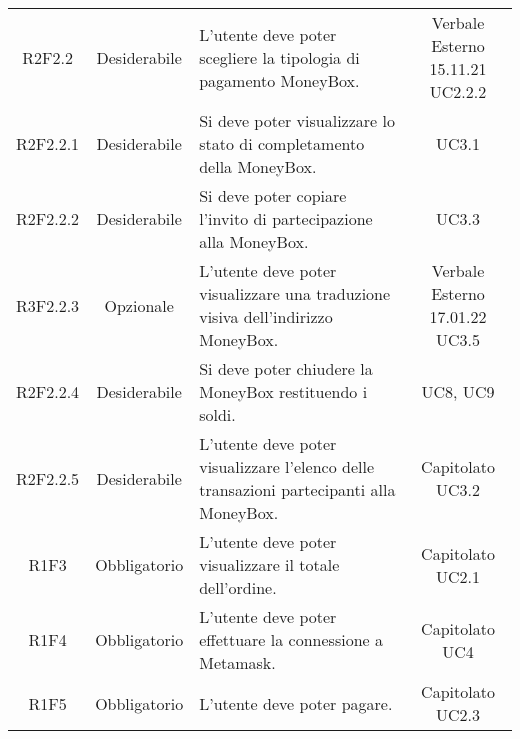 \begin{table}[H]
\begin{tabular}{c | c | p{6cm} | c }
        R2F2.2                                                            & Desiderabile & L'utente deve poter scegliere la tipologia di pagamento MoneyBox\glo{}.                       & \Shortunderstack{Verbale Esterno 15.11.21 \\UC2.2.2\\}      \\
        R2F2.2.1                                                          & Desiderabile & Si deve poter visualizzare lo stato di completamento della MoneyBox\glo{}.                    & UC3.1                                     \\
        R2F2.2.2                                                          & Desiderabile & Si deve poter copiare l'invito di partecipazione alla MoneyBox\glo{}.                         & UC3.3                                     \\
        R3F2.2.3                                                          & Opzionale    & L'utente deve poter visualizzare una traduzione visiva dell'indirizzo MoneyBox\glo{}.         & \Shortunderstack{Verbale Esterno 17.01.22 \\UC3.5\\}        \\
        R2F2.2.4                                                          & Desiderabile & Si deve poter chiudere la MoneyBox\glo{} restituendo i soldi.                                 & UC8, UC9                                  \\
        R2F2.2.5                                                          & Desiderabile & L'utente deve poter visualizzare l'elenco delle transazioni partecipanti alla MoneyBox\glo{}. & \Shortunderstack{Capitolato               \\UC3.2\\} \\
        R1F3                                                              & Obbligatorio & L'utente deve poter visualizzare il totale dell'ordine.                                       & \Shortunderstack{Capitolato               \\UC2.1\\} \\
        R1F4                                                              & Obbligatorio & L'utente deve poter effettuare la connessione a Metamask\glo{}.                               & \Shortunderstack{Capitolato               \\UC4\\}   \\
        R1F5                                                              & Obbligatorio & L'utente deve poter pagare.                                                                   & \Shortunderstack{Capitolato               \\UC2.3\\} \\
    \end{tabular}
\end{table}
